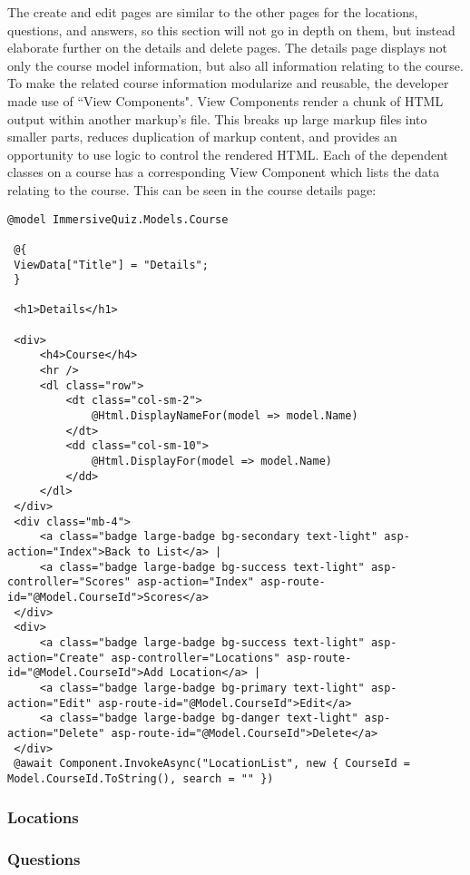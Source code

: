  The create and edit pages are similar to the other pages for the locations, questions, and answers, so this section will not go in depth on them, but instead elaborate further on the details and delete pages. The details page displays not only the course model information, but also all information relating to the course. To make the related course information modularize and reusable, the developer made use of ``View Components". View Components render a chunk of HTML output within another markup's file. This breaks up large markup files into smaller parts, reduces duplication of markup content, and provides an opportunity to use logic to control the rendered HTML. Each of the dependent classes on a course has a corresponding View Component which lists the data relating to the course. This can be seen in the course details page:
 \begin{lstlisting}[style=htmlcssjs, caption=Course Details Razor Page, label=lst:CourseDetails]
 @model ImmersiveQuiz.Models.Course
 
 @{
 ViewData["Title"] = "Details";
 }
 
 <h1>Details</h1>
 
 <div>
	 <h4>Course</h4>
	 <hr />
	 <dl class="row">
		 <dt class="col-sm-2">
			 @Html.DisplayNameFor(model => model.Name)
		 </dt>
		 <dd class="col-sm-10">
			 @Html.DisplayFor(model => model.Name)
		 </dd>
	 </dl>
 </div>
 <div class="mb-4">
	 <a class="badge large-badge bg-secondary text-light" asp-action="Index">Back to List</a> |
	 <a class="badge large-badge bg-success text-light" asp-controller="Scores" asp-action="Index" asp-route-id="@Model.CourseId">Scores</a>
 </div>
 <div>
	 <a class="badge large-badge bg-success text-light" asp-action="Create" asp-controller="Locations" asp-route-id="@Model.CourseId">Add Location</a> |
	 <a class="badge large-badge bg-primary text-light" asp-action="Edit" asp-route-id="@Model.CourseId">Edit</a>
	 <a class="badge large-badge bg-danger text-light" asp-action="Delete" asp-route-id="@Model.CourseId">Delete</a> 
 </div>
 @await Component.InvokeAsync("LocationList", new { CourseId = Model.CourseId.ToString(), search = "" })
 \end{lstlisting}
 
\subsubsection{Locations}

\subsubsection{Questions}

